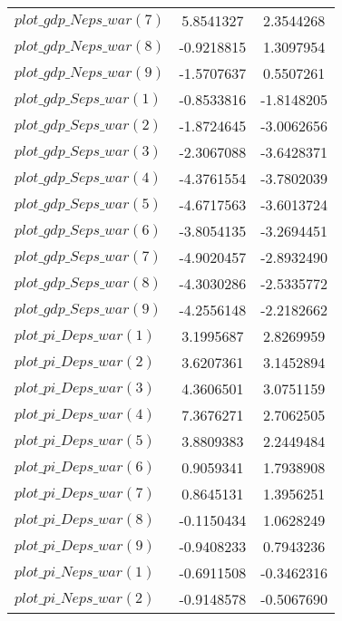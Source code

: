 \begin{center}
\begin{longtable}{lcc}
$plot\_gdp\_N eps\_war (7)  $	 & 	      5.8541327	 & 	      2.3544268 \\ 
$plot\_gdp\_N eps\_war (8)  $	 & 	     -0.9218815	 & 	      1.3097954 \\ 
$plot\_gdp\_N eps\_war (9)  $	 & 	     -1.5707637	 & 	      0.5507261 \\ 
$plot\_gdp\_S eps\_war (1)  $	 & 	     -0.8533816	 & 	     -1.8148205 \\ 
$plot\_gdp\_S eps\_war (2)  $	 & 	     -1.8724645	 & 	     -3.0062656 \\ 
$plot\_gdp\_S eps\_war (3)  $	 & 	     -2.3067088	 & 	     -3.6428371 \\ 
$plot\_gdp\_S eps\_war (4)  $	 & 	     -4.3761554	 & 	     -3.7802039 \\ 
$plot\_gdp\_S eps\_war (5)  $	 & 	     -4.6717563	 & 	     -3.6013724 \\ 
$plot\_gdp\_S eps\_war (6)  $	 & 	     -3.8054135	 & 	     -3.2694451 \\ 
$plot\_gdp\_S eps\_war (7)  $	 & 	     -4.9020457	 & 	     -2.8932490 \\ 
$plot\_gdp\_S eps\_war (8)  $	 & 	     -4.3030286	 & 	     -2.5335772 \\ 
$plot\_gdp\_S eps\_war (9)  $	 & 	     -4.2556148	 & 	     -2.2182662 \\ 
$plot\_pi\_D eps\_war (1)   $	 & 	      3.1995687	 & 	      2.8269959 \\ 
$plot\_pi\_D eps\_war (2)   $	 & 	      3.6207361	 & 	      3.1452894 \\ 
$plot\_pi\_D eps\_war (3)   $	 & 	      4.3606501	 & 	      3.0751159 \\ 
$plot\_pi\_D eps\_war (4)   $	 & 	      7.3676271	 & 	      2.7062505 \\ 
$plot\_pi\_D eps\_war (5)   $	 & 	      3.8809383	 & 	      2.2449484 \\ 
$plot\_pi\_D eps\_war (6)   $	 & 	      0.9059341	 & 	      1.7938908 \\ 
$plot\_pi\_D eps\_war (7)   $	 & 	      0.8645131	 & 	      1.3956251 \\ 
$plot\_pi\_D eps\_war (8)   $	 & 	     -0.1150434	 & 	      1.0628249 \\ 
$plot\_pi\_D eps\_war (9)   $	 & 	     -0.9408233	 & 	      0.7943236 \\ 
$plot\_pi\_N eps\_war (1)   $	 & 	     -0.6911508	 & 	     -0.3462316 \\ 
$plot\_pi\_N eps\_war (2)   $	 & 	     -0.9148578	 & 	     -0.5067690 \\ 

\end{longtable}
\end{center}
